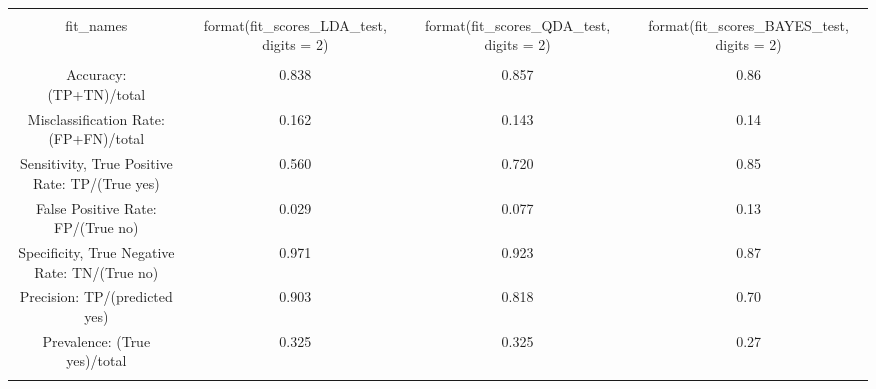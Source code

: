 
\begin{table}[!htbp] \centering 
  \caption{} 
  \label{} 
\begin{tabular}{@{\extracolsep{5pt}} cccc} 
\\[-1.8ex]\hline 
\hline \\[-1.8ex] 
fit\_names & format(fit\_scores\_LDA\_test, digits = 2) & format(fit\_scores\_QDA\_test, digits = 2) & format(fit\_scores\_BAYES\_test, digits = 2) \\ 
\hline \\[-1.8ex] 
Accuracy: (TP+TN)/total & 0.838 & 0.857 & 0.86 \\ 
Misclassification Rate: (FP+FN)/total & 0.162 & 0.143 & 0.14 \\ 
Sensitivity, True Positive Rate: TP/(True yes) & 0.560 & 0.720 & 0.85 \\ 
False Positive Rate: FP/(True no) & 0.029 & 0.077 & 0.13 \\ 
Specificity, True Negative Rate: TN/(True no) & 0.971 & 0.923 & 0.87 \\ 
Precision: TP/(predicted yes) & 0.903 & 0.818 & 0.70 \\ 
Prevalence: (True yes)/total & 0.325 & 0.325 & 0.27 \\ 
\hline \\[-1.8ex] 
\end{tabular} 
\end{table} 
